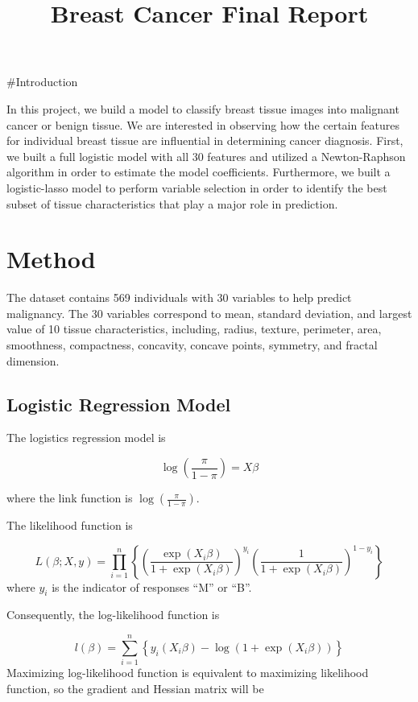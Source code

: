 \documentclass[]{article}
\title{Breast Cancer Final Report}
\author{}
\date{\vspace{-2.5em}}
\begin{document}
\maketitle

\#Introduction

In this project, we build a model to classify breast tissue images into
malignant cancer or benign tissue. We are interested in observing how
the certain features for individual breast tissue are influential in
determining cancer diagnosis. First, we built a full logistic model with
all 30 features and utilized a Newton-Raphson algorithm in order to
estimate the model coefficients. Furthermore, we built a logistic-lasso
model to perform variable selection in order to identify the best subset
of tissue characteristics that play a major role in prediction.

\hypertarget{method}{%
\section{Method}\label{method}}

The dataset contains 569 individuals with 30 variables to help predict
malignancy. The 30 variables correspond to mean, standard deviation, and
largest value of 10 tissue characteristics, including, radius, texture,
perimeter, area, smoothness, compactness, concavity, concave points,
symmetry, and fractal dimension.

\hypertarget{logistic-regression-model}{%
\subsection{Logistic Regression Model}\label{logistic-regression-model}}

The logistics regression model is

\[
\log(\frac{\pi}{1-\pi})=X\beta
\]

where the link function is \(\log(\frac{\pi}{1-\pi})\).

The likelihood function is

\[
L(\beta ; X, y)=\prod_{i=1}^{n}\left\{\left(\frac{\exp \left(X_{i} \beta\right)}{1+\exp \left(X_{i} \beta\right)}\right)^{y_{i}}\left(\frac{1}{1+\exp \left(X_{i} \beta\right)}\right)^{1-y_{i}}\right\}
\] where \(y_i\) is the indicator of responses ``M'' or ``B''.

Consequently, the log-likelihood function is

\[
l(\beta)=\sum_{i=1}^{n}\left\{y_{i}\left(X_{i} \beta\right)-\log \left(1+\exp \left(X_{i} \beta\right)\right)\right\}
\] Maximizing log-likelihood function is equivalent to maximizing
likelihood function, so the gradient and Hessian matrix will be
\end{document}
